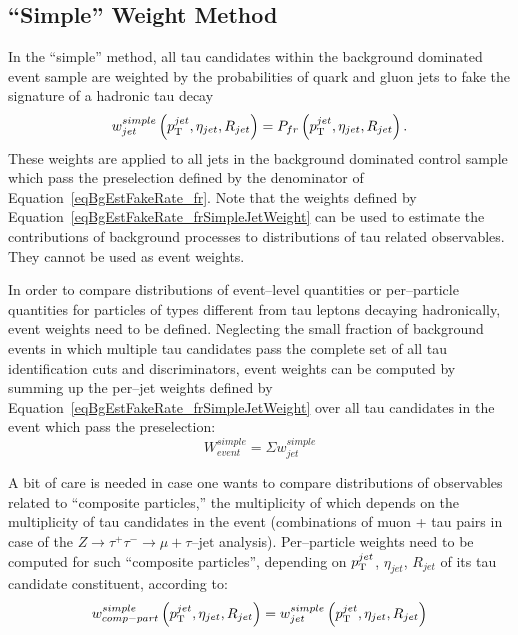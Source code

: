 \subsection{``Simple'' Weight Method}
%
In the ``simple'' method, all tau candidates within the background dominated
event sample are weighted by the probabilities of quark and gluon jets to fake
the signature of a hadronic tau decay
\begin{equation}
w_{jet}^{simple} \left( p_{\mathrm{T}}^{jet}, \eta_{jet}, R_{jet} \right) = P_{fr} \left(
p_{\mathrm{T}}^{jet}, \eta_{jet}, R_{jet} \right).
\label{eqBgEstFakeRate_frSimpleJetWeight}
\end{equation}
These weights are applied to all jets in the background dominated control sample
which pass the preselection defined by the denominator of
Equation~\ref{eqBgEstFakeRate_fr}.  Note that the weights defined by
Equation~\ref{eqBgEstFakeRate_frSimpleJetWeight} can be used to estimate the
contributions of background processes to distributions of tau related
observables.  They cannot be used as event weights.

In order to compare distributions of event--level quantities or per--particle
quantities for particles of types different from tau leptons decaying
hadronically, event weights need to be defined.  Neglecting the small fraction
of background events in which multiple tau candidates pass the complete set
of all tau identification cuts and discriminators, event weights can be computed
by summing up the per--jet weights defined by
Equation~\ref{eqBgEstFakeRate_frSimpleJetWeight} over all tau candidates in
the event which pass the preselection:
\begin{equation}
W_{event}^{simple} = \Sigma w_{jet}^{simple}
\label{eqBgEstFakeRate_frSimpleEventWeight}
\end{equation}

A bit of care is needed in case one wants to compare distributions of
observables related to ``composite particles,'' the multiplicity of which depends
on the multiplicity of tau candidates in the event (\eg combinations of
muon + tau pairs in case of the $Z \rightarrow \tau^{+} \tau^{-}
\rightarrow \mu + \tau\mbox{--jet}$ analysis).  Per--particle weights need to be
computed for such ``composite particles'', depending on $p_{\mathrm{T}}^{jet}$,
$\eta_{jet}$, $R_{jet}$ of its tau candidate constituent, according to:
\begin{equation}
w_{comp-part}^{simple} \left( p_{\mathrm{T}}^{jet}, \eta_{jet}, R_{jet} \right) = 
  w_{jet}^{simple} \left( p_{\mathrm{T}}^{jet}, \eta_{jet}, R_{jet} \right)
\label{eqBgEstFakeRate_frSimpleCompositeParticleWeight}
\end{equation}

